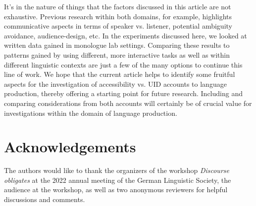 \documentclass[output=paper,colorlinks,citecolor=brown]{langscibook}
\begin{document}
It's in the nature of things that the factors discussed in this article are not exhaustive. Previous research within both domains, for example, highlights communicative aspects in terms of speaker vs. listener, potential ambiguity avoidance, audience-design, etc. 
In the experiments discussed here, we looked at written data gained in monologue lab settings. Comparing these results to patterns gained by using different, more interactive tasks as well as within different linguistic contexts are just a few of the many options to continue this line of work.
We hope that the current article helps to identify some fruitful aspects for the investigation of accessibility vs. UID accounts to language production, thereby offering a starting point for future research. 
Including and comparing considerations from both accounts will certainly be of crucial value for investigations within the domain of language production.

\section*{Acknowledgements}
The authors would like to thank the organizers of the workshop \textit{Discourse obligates} at the 2022 annual meeting of the German Linguistic Society, the audience at the workshop, as well as two anonymous reviewers for helpful discussions and comments. 




\sloppy
\printbibliography[heading=subbibliography,notkeyword=this]
\end{document}
